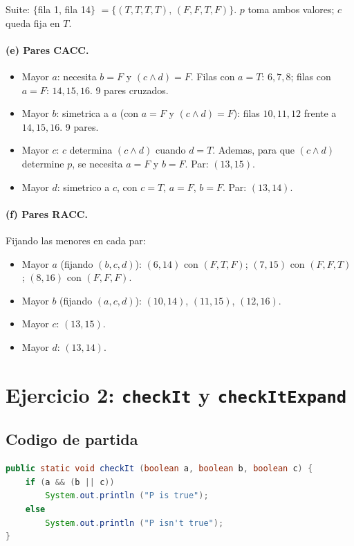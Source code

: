 \documentclass[12pt,a4paper]{article}
\begin{document}
Suite: $\{$fila 1, fila 14$\}$ $=\{(T,T,T,T),\,(F,F,T,F)\}$. $p$ toma ambos valores; $c$ queda
fija en $T$.

\paragraph{(e) Pares CACC.}

\begin{itemize}
  \item Mayor $a$: necesita $b=F$ y $(c\wedge d)=F$. Filas con $a=T$: $6,7,8$; filas con $a=F$:
  $14,15,16$. 9 pares cruzados.
  \item Mayor $b$: simetrica a $a$ (con $a=F$ y $(c\wedge d)=F$): filas $10,11,12$ frente a
  $14,15,16$. 9 pares.
  \item Mayor $c$: $c$ determina $(c \wedge d)$ cuando $d=T$. Ademas, para que $(c\wedge d)$
  determine $p$, se necesita $a=F$ y $b=F$. Par: $(13,15)$.
  \item Mayor $d$: simetrico a $c$, con $c=T$, $a=F$, $b=F$. Par: $(13,14)$.
\end{itemize}

\paragraph{(f) Pares RACC.} Fijando las menores en cada par:

\begin{itemize}
  \item Mayor $a$ (fijando $(b,c,d)$): $(6,14)$ con $(F,T,F)$; $(7,15)$ con $(F,F,T)$; $(8,16)$
  con $(F,F,F)$.
  \item Mayor $b$ (fijando $(a,c,d)$): $(10,14)$, $(11,15)$, $(12,16)$.
  \item Mayor $c$: $(13,15)$.
  \item Mayor $d$: $(13,14)$.
\end{itemize}

\section{Ejercicio 2: \texttt{checkIt} y \texttt{checkItExpand}}

\subsection{Codigo de partida}

\begin{lstlisting}[style=codestyle,language=Java]
public static void checkIt (boolean a, boolean b, boolean c) {
    if (a && (b || c))
        System.out.println ("P is true");
    else
        System.out.println ("P isn't true");
}
\end{lstlisting}
\end{document}

